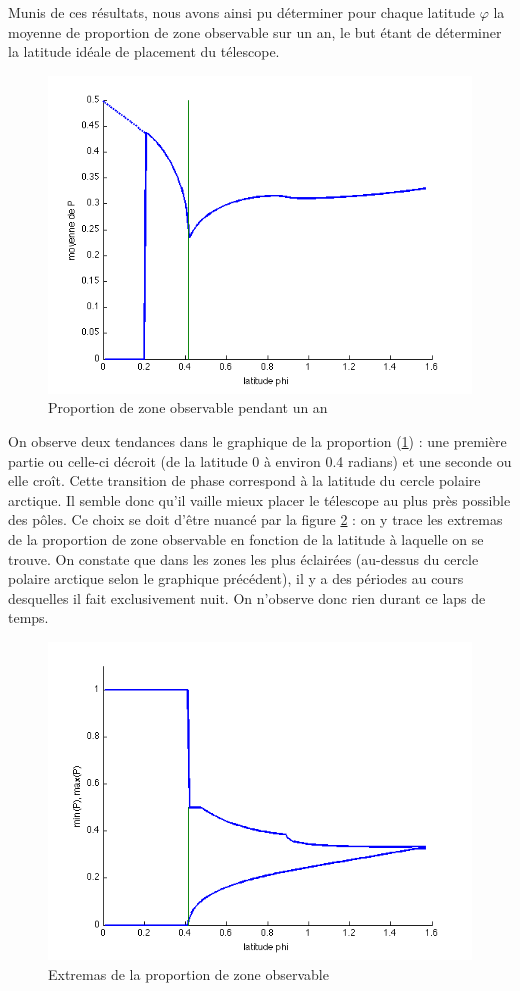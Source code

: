 \documentclass[a4paper,11pt]{article}
\numberwithin{section}{part}
\begin{document}
Munis de ces r\'esultats,  nous avons ainsi pu d\'eterminer pour chaque latitude $\varphi$ la moyenne de proportion de zone observable sur un an, le but \'etant de d\'eterminer la latitude id\'eale de placement du t\'elescope. \\

 \begin{figure}[h]\label{opt}
    \centering
    \includegraphics[width=.7\textwidth]{opt.png}
    \caption{Proportion de zone observable pendant un an}
 \end{figure}
 
 On observe deux tendances dans le graphique de la proportion (\ref{opt}) : une premi\`ere partie ou celle-ci d\'ecroit (de la latitude $0$ \`a environ 0.4 radians) et une seconde ou elle cro\^it. Cette transition de phase correspond \`a la latitude du cercle polaire arctique. Il semble donc qu'il vaille mieux placer le t\'elescope au plus pr\`es possible des p\^oles.
 Ce choix se doit d'\^etre nuanc\'e par la figure \ref{ecart} : on y trace les extremas de la proportion de zone observable en fonction de la latitude \`a laquelle on se trouve.
 On constate que dans les zones les plus \'eclair\'ees (au-dessus du cercle polaire arctique selon le graphique pr\'ec\'edent), il y a des p\'eriodes au cours desquelles il fait exclusivement nuit.
 On n'observe donc rien durant ce laps de temps.
  \begin{figure}[h]\label{ecart}
    \centering
    \includegraphics[width=.7\textwidth]{ecart.png}
    \caption{Extremas de la proportion de zone observable}
 \end{figure}
\end{document}
